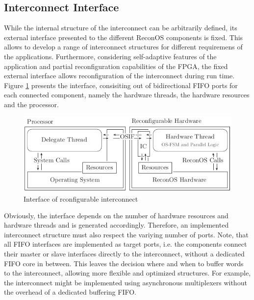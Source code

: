 \subsection{Interconnect Interface}
While the internal structure of the interconnect can be arbitrarily defined,
its external interface presented to the different ReconOS components is fixed.
This allows to develop a range of interconnect structures for different
requiremens of the applications. Furthermore, considering self-adaptive
features of the application and partial reconfiguration capabilities of the
\ac{FPGA}, the fixed external interface allows reconfiguration of the
interconnect during run time. Figure \ref{fig:interconnect_if} presents the
interface, consisiting out of bidirectional \ac{FIFO} ports for each connected
component, namely the hardware threads, the hardware resources and the
processor.
\begin{figure}[tb]
	\centering
	\includegraphics[width=12cm]{../figures/interconnect}
	\caption{Interface of rconfigurable interconnect}
	\label{fig:interconnect_if}
\end{figure}
Obviously, the interface depends on the number of hardware resources and
hardware threads and is generated accordingly. Therefore, an implemented
interconnect structure must also respect the variying number of ports. Note,
that all \ac{FIFO} interfaces are implemented as target ports, i.e. the
components connect their master or slave interfaces directly to the
interconnect, without a dedicated \ac{FIFO} core in between. This leaves the
decision where and when to buffer words to the interconnect, allowing more
flexible and optimized structures. For example, the interconnect might be
implemented using asynchronous multiplexers without the overhead of a
dedicated buffering \ac{FIFO}.

